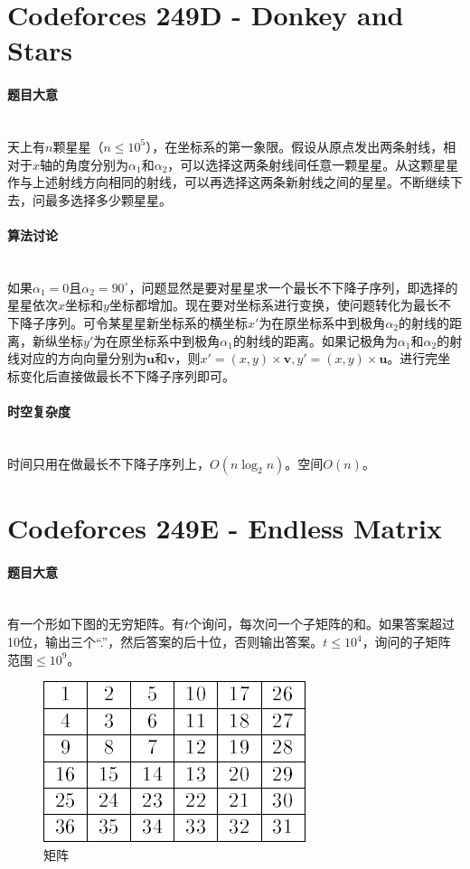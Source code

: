 \documentclass[UTF8]{ctexart}
\newcommand{\myparagraph}[1]{\paragraph{#1}\mbox{}\\}
\theoremstyle{nonumberplain}
\begin{document}
	\section{Codeforces 249D - Donkey and Stars}
	
		\myparagraph{题目大意}
		
			天上有$n$颗星星（$n \leq 10^5$），在坐标系的第一象限。假设从原点发出两条射线，相对于$x$轴的角度分别为$\alpha_1$和$\alpha_2$，可以选择这两条射线间任意一颗星星。从这颗星星作与上述射线方向相同的射线，可以再选择这两条新射线之间的星星。不断继续下去，问最多选择多少颗星星。
		
		\myparagraph{算法讨论}
		
			如果$\alpha_1=0$且$\alpha_2=90^\circ$，问题显然是要对星星求一个最长不下降子序列，即选择的星星依次$x$坐标和$y$坐标都增加。现在要对坐标系进行变换，使问题转化为最长不下降子序列。可令某星星新坐标系的横坐标$x'$为在原坐标系中到极角$\alpha_2$的射线的距离，新纵坐标$y'$为在原坐标系中到极角$\alpha_1$的射线的距离。如果记极角为$\alpha_1$和$\alpha_2$的射线对应的方向向量分别为$\boldsymbol{u}$和$\boldsymbol{v}$，则$x'=(x,y)\times \boldsymbol{v}, y'=(x,y)\times \boldsymbol{u}$。进行完坐标变化后直接做最长不下降子序列即可。
		
		\myparagraph{时空复杂度}
		
			时间只用在做最长不下降子序列上，$O(n\log_2n)$。空间$O(n)$。
	
	\section{Codeforces 249E - Endless Matrix}
	
		\myparagraph{题目大意}
		
			有一个形如下图的无穷矩阵。有$t$个询问，每次问一个子矩阵的和。如果答案超过10位，输出三个“.”，然后答案的后十位，否则输出答案。$t \leq 10^4$，询问的子矩阵范围$\leq 10^9$。
			
			\begin{figure}[ht]
				\centering
				\includegraphics[width=.7\textwidth]{fig249e_1.png}
				\caption{矩阵}
			\end{figure}
		
\end{document}
